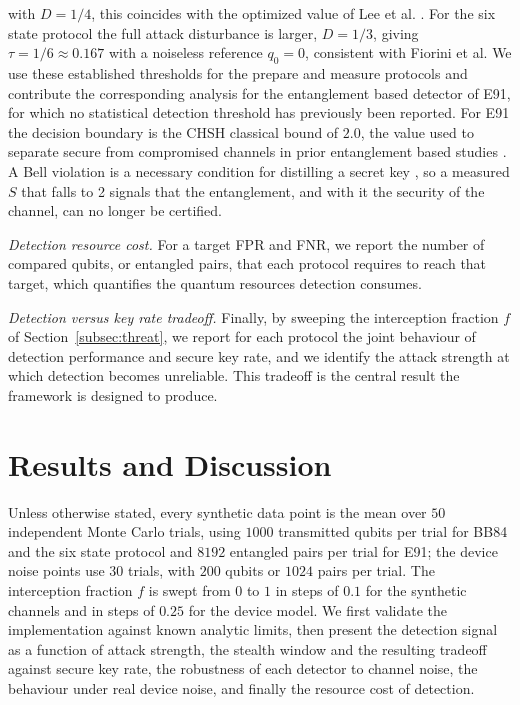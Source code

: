 \documentclass[conference]{IEEEtran}
\begin{document}
with $D = 1/4$, this coincides with the optimized value of Lee et al.
\cite{lee2022eavesdropping}. For the six state protocol the full attack
disturbance is larger, $D = 1/3$, giving $\tau = 1/6 \approx 0.167$ with a
noiseless reference $q_0 = 0$, consistent with Fiorini et al. We use these
established thresholds for the prepare and measure protocols and contribute the
corresponding analysis for the entanglement based detector of E91, for which no
statistical detection threshold has previously been reported. For E91 the
decision boundary is the CHSH classical bound of $2.0$, the value used to
separate secure from compromised channels in prior entanglement based studies
\cite{ekert1991quantum, dhakal2025performance, kadir2025e91}. A Bell violation is
a necessary condition for distilling a secret key \cite{singh2021role}, so a
measured $S$ that falls to 2 signals that the entanglement, and with it the
security of the channel, can no longer be certified.

\textit{Detection resource cost.} For a target FPR and FNR, we report the number
of compared qubits, or entangled pairs, that each protocol requires to reach
that target, which quantifies the quantum resources detection consumes.

\textit{Detection versus key rate tradeoff.} Finally, by sweeping the
interception fraction $f$ of Section~\ref{subsec:threat}, we report for each
protocol the joint behaviour of detection performance and secure key rate, and
we identify the attack strength at which detection becomes unreliable. This
tradeoff is the central result the framework is designed to produce.

\section{Results and Discussion}
\label{sec:results}
Unless otherwise stated, every synthetic data point is the mean over $50$
independent Monte Carlo trials, using $1000$ transmitted qubits per trial for
BB84 and the six state protocol and $8192$ entangled pairs per trial for E91; the
device noise points use $30$ trials, with $200$ qubits or $1024$ pairs per trial.
The interception fraction $f$ is swept from $0$ to $1$ in steps of $0.1$ for the
synthetic channels and in steps of $0.25$ for the device model. We first validate
the implementation against known analytic limits, then present the detection
signal as a function of attack strength, the stealth window and the resulting
tradeoff against secure key rate, the robustness of each detector to channel
noise, the behaviour under real device noise, and finally the resource cost of
detection.
\end{document}
